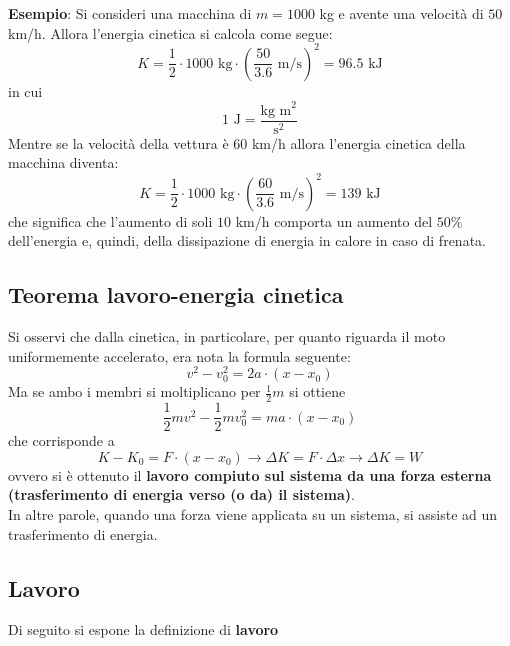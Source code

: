 \documentclass[a4paper]{extarticle}
\begin{document}
\vspace{1em}
\noindent
\textbf{Esempio}: Si consideri una macchina di $m=1000$ kg e avente una velocità di $50$ km/h. Allora l'energia cinetica si calcola come segue:
\[K=\frac{1}{2} \cdot 1000 \text{ kg} \cdot \left( \frac{50}{3.6} \text{ m/s} \right)^2 = 96.5 \text{ kJ}\]
in cui
\[\boxed{1 \text{ J} = \frac{\text{kg m}^2}{\text{s}^2}}\]
Mentre se la velocità della vettura è $60$ km/h allora l'energia cinetica della macchina diventa:
\[K=\frac{1}{2} \cdot 1000 \text{ kg} \cdot \left( \frac{60}{3.6} \text{ m/s} \right)^2 = 139 \text{ kJ}\]
che significa che l'aumento di soli $10$ km/h comporta un aumento del $50\%$ dell'energia e, quindi, della dissipazione di energia in calore in caso di frenata.

\vspace{1em}
\subsection{Teorema lavoro-energia cinetica}
Si osservi che dalla cinetica, in particolare, per quanto riguarda il moto uniformemente accelerato, era nota la formula seguente:
\[v^2 - v_0^2 = 2a \cdot (x-x_0)\]
Ma se ambo i membri si moltiplicano per $\frac{1}{2}m$ si ottiene
\[\frac{1}{2} m v^2 - \frac{1}{2} m v_0^2 = ma \cdot (x-x_0)\]
che corrisponde a
\[K - K_0 = F \cdot (x-x_0) \longrightarrow \Delta K = F \cdot \Delta x \longrightarrow \Delta K = W\]
ovvero si è ottenuto il \textbf{lavoro compiuto sul sistema da una forza esterna (trasferimento di energia verso (o da) il sistema)}.\\
In altre parole, quando una forza viene applicata su un sistema, si assiste ad un trasferimento di energia.

\vspace{1em}
\subsection{Lavoro}
Di seguito si espone la definizione di \textbf{lavoro}
\end{document}

